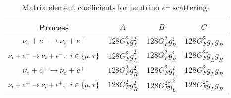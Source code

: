 \begin{table}[ht]
\centering 
\begin{tabular}{|c|c|c|c|}
\hline
Process &$A$&$B$&$C$  \\
\hline
$\nu_e+e^-\rightarrow \nu_e+e^-$&$128G_F^2g_L^2$&$128G_F^2g_R^2$&$128G_F^2g_Lg_R$\\
\hline
$\nu_i+e^-\rightarrow \nu_i+e^-,\hspace{2mm} i\in\{\mu,\tau\}$&$128G_F^2\tilde g_L^2$&$128G_F^2g_R^2$&$128G_F^2\tilde g_Lg_R$\\
\hline
$\nu_e+e^+\rightarrow \nu_e+e^+$&$128G_F^2g_R^2$&$128G_F^2g_L^2$&$128G_F^2g_Lg_R$\\
\hline
$\nu_i+e^+\rightarrow \nu_i+e^+,\hspace{2mm} i\in\{\mu,\tau\}$&$128G_F^2 g_R^2$&$128G_F^2\tilde g_L^2$&$128G_F^2\tilde g_Lg_R$\\
\hline
\end{tabular}
\caption{Matrix element coefficients for neutrino $e^\pm$ scattering.}
\label{table:nu:e:coeff}
\end{table}



